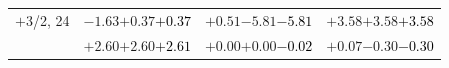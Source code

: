 \documentclass[compress]{beamer}
\begin{document}
\begin{frame}
\begin{tabular}{r | c | c | c}
$+$3/2, 24 & $-1.63$\hspace{0.1 cm}$+0.37$\hspace{0.1 cm}\textcolor{black}{$+0.37$} & $+0.51$\hspace{0.1 cm}$-5.81$\hspace{0.1 cm}\textcolor{black}{$-5.81$} & $+3.58$\hspace{0.1 cm}$+3.58$\hspace{0.1 cm}\textcolor{black}{$+3.58$} \\
           & $+2.60$\hspace{0.1 cm}$+2.60$\hspace{0.1 cm}\textcolor{black}{$+2.61$} & $+0.00$\hspace{0.1 cm}$+0.00$\hspace{0.1 cm}\textcolor{black}{$-0.02$} & $+0.07$\hspace{0.1 cm}$-0.30$\hspace{0.1 cm}\textcolor{black}{$-0.30$} \\
\end{tabular}
\end{frame}
\end{document}
